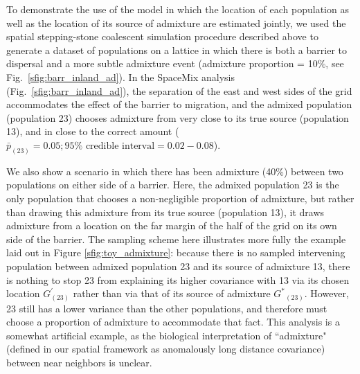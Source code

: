 \documentclass[12pt]{article}
\newcommand{\identifyadmixsource}[1]{{#1^{*}}}
\begin{document}
To demonstrate the use of the model in which the location of each population as well as the location of its source of admixture are estimated jointly, we used the spatial stepping-stone coalescent simulation procedure described above to generate a dataset of populations on a lattice in which there is both a barrier to dispersal and a more subtle admixture event (admixture proportion = 10\%, see Fig.\ \ref{sfig:barr_inland_ad}).  In the SpaceMix analysis (Fig.\ \ref{sfig:barr_inland_ad}), the separation of the east and west sides of the grid accommodates the effect of the barrier to migration, and the admixed population (population 23) chooses admixture from very close to its true source (population 13), and in close to the correct amount ($\bar{p}_{(23)} = 0.05; 95\% \text{ credible interval} = 0.02-0.08$). 

We also show a scenario in which there has been admixture (40\%) between two populations on either side of a barrier.  Here, the admixed population 23 is the only population that chooses a non-negligible proportion of admixture, but rather than drawing this admixture from its true source (population 13), it draws admixture from a location on the far margin of the half of the grid on its own side of the barrier.  The sampling scheme here illustrates more fully the example laid out in Figure \ref{sfig:toy_admixture}: because there is no sampled intervening population between admixed population 23 and its source of admixture 13, there is nothing to stop 23 from explaining its higher covariance with 13 via its chosen location $G_{(23)}^{\prime}$ rather than via that of its source of admixture $\identifyadmixsource{G}_{(23)}$.  
However, 23 still has a lower variance than the other populations, and therefore must choose a proportion of admixture to accommodate that fact.  This analysis is a somewhat artificial example, as the biological interpretation of ``admixture" (defined in our spatial framework as anomalously long distance covariance) between near neighbors is unclear.
\end{document}
